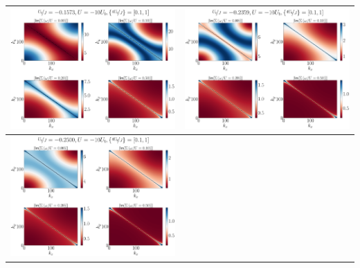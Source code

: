 \documentclass{report}
\numberwithin{equation}{section}
\begin{document}
{\begin{center}
\begin{tabular}{c|c}
\hline
\includegraphics[height=0.3\textheight]{../figures/sigma-4-Ub_by_J=-0.15735-4.pdf} &
\includegraphics[height=0.3\textheight]{../figures/sigma-4-Ub_by_J=-0.23594-4.pdf}\\
\hline
\includegraphics[height=0.3\textheight]{../figures/sigma-4-Ub_by_J=-0.25000-4.pdf} &

\end{tabular}
\end{center}}
\end{document}
